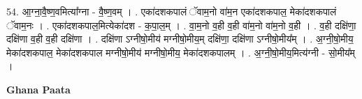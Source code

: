 \documentclass[17pt]{extarticle}
\begin{document}
54. आ॒ग्ना॒वै॒ष्ण॒वमित्या᳚ग्ना - वै॒ष्ण॒वम् । . एका॑दशकपालं ॅवाम॒नो वा॑म॒न एका॑दशकपाल॒ मेका॑दशकपालं ॅवाम॒नः । . एका॑दशकपाल॒मित्येका॑दश - क॒पा॒ल॒म् । . वा॒म॒नो व॒ही व॒ही वा॑म॒नो वा॑म॒नो व॒ही । . व॒ही दक्षि॑णा॒ दक्षि॑णा व॒ही व॒ही दक्षि॑णा । . दक्षि॑णा ऽग्नीषो॒मीय॑ मग्नीषो॒मीय॒म् दक्षि॑णा॒ दक्षि॑णा ऽग्नीषो॒मीय᳚म् । . अ॒ग्नी॒षो॒मीय॒ मेका॑दशकपाल॒ मेका॑दशकपाल मग्नीषो॒मीय॑ मग्नीषो॒मीय॒ मेका॑दशकपालम् । . अ॒ग्नी॒षो॒मीय॒मित्य॑ग्नी - सो॒मीय᳚म् । \newline

\textbf{Ghana Paata } \newline
\end{document}
